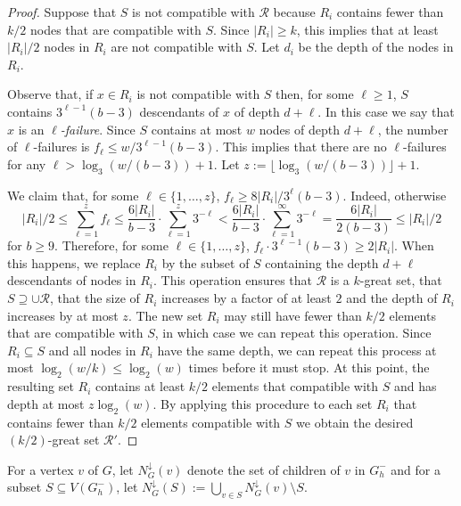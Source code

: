 \documentclass{patmorin}
\newcommand{\defin}[1]{\emph{\color{brightmaroon}#1}}
\begin{document}
\begin{proof}
  Suppose that $S$ is not compatible with $\mathcal{R}$ because $R_i$ contains fewer than $k/2$ nodes that are compatible with $S$.  Since $|R_i|\ge k$, this implies that at least $|R_i|/2$ nodes in $R_i$ are not compatible with $S$. Let $d_i$ be the depth of the nodes in $R_i$.  

  Observe that, if $x\in R_i$ is not compatible with $S$ then, for some $\ell\ge 1$, $S$ contains $3^{\ell-1}(b-3)$ descendants of $x$ of depth $d+\ell$.  In this case we say that $x$ is an \defin{$\ell$-failure}. Since $S$ contains at most $w$ nodes of depth $d+\ell$, the number of $\ell$-failures is 
  $f_\ell \le w/3^{\ell-1}(b-3)$.  This implies that there are no $\ell$-failures for any $\ell > \log_3 (w/(b-3)) + 1$.  Let $z:= \lfloor\log_3 (w/(b-3))\rfloor + 1$.

  We claim that, for some $\ell\in\{1,\ldots,z\}$, $f_\ell \ge 8|R_i|/3^{\ell}(b-3)$.  Indeed, otherwise
  \[
    |R_i|/2 \le \sum_{\ell=1}^{z} f_\ell \le \frac{6|R_i|}{b-3}\cdot \sum_{\ell=1}^z 3^{-\ell} < \frac{6|R_i|}{b-3}\cdot \sum_{\ell=1}^\infty 3^{-\ell}
    = \frac{6|R_i|}{2(b-3)}  \le  |R_i|/2
  \]
  for $b\ge 9$. Therefore, for some $\ell\in\{1,\ldots,z\}$, $f_\ell\cdot 3^{\ell-1}(b-3) \ge 2|R_i|$.  When this happens, we replace $R_i$ by the subset of $S$ containing the depth $d+\ell$ descendants of nodes in $R_i$.  This operation ensures that $\mathcal{R}$ is a $k$-great set, that $S\supseteq \cup\mathcal{R}$, that the size of $R_i$ increases by a factor of at least $2$ and the depth of $R_i$ increases by at most $z$. The new set $R_i$ may still have fewer than $k/2$ elements that are compatible with $S$, in which case we can repeat this operation.  Since $R_i\subseteq S$ and all nodes in $R_i$ have the same depth, we can repeat this process at most $\log_2(w/k)\le \log_2(w)$ times before it must stop.  At this point, the resulting set $R_i$ contains at least $k/2$ elements that compatible with $S$ and has depth at most $z\log_2(w)$. By applying this procedure to each set $R_i$ that contains fewer than $k/2$ elements compatible with $S$ we obtain the desired $(k/2)$-great set $\mathcal{R}'$.
\end{proof}

For a vertex $v$ of $G$, let $N^\downarrow_{G}(v)$ denote the set of children of $v$ in $G_h^-$ and for a subset $S\subseteq V(G_h^-)$, let $N^\downarrow_G(S):=\bigcup_{v\in S}N^\downarrow_G(v)\setminus S$.

\end{document}
